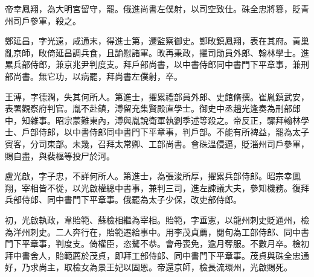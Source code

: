 \begin{pinyinscope}
 帝幸鳳翔，為大明宮留守，罷。俄進尚書左僕射，以司空致仕。硃全忠將篡，貶青州司戶參軍，殺之。



 鄭延昌，字光遠，咸通末，得進士第，遷監察御史。鄭畋鎮鳳翔，表在其府。黃巢亂京師，畋倚延昌調兵食，且諭慰諸軍。畋再秉政，擢司勛員外郎、翰林學士。進累兵部侍郎，兼京兆尹判度支。拜戶部尚書，以中書侍郎同中書門下平章事，兼刑部尚書。無它功，以病罷，拜尚書左僕射，卒。



 王溥，字德潤，失其何所人。第進士，擢累禮部員外郎、史館脩撰。崔胤鎮武安，表署觀察府判官。胤不赴鎮，溥留充集賢殿直學士。御史中丞趙光逢奏為刑部郎中，知雜事。昭宗蒙難東內，溥與胤說衛軍執劉季述等殺之。帝反正，驟拜翰林學士、戶部侍郎，以中書侍郎同中書門下平章事，判戶部。不能有所裨益，罷為太子賓客，分司東部。未幾，召拜太常卿、工部尚書。會硃溫侵逼，貶淄州司戶參軍，賜自盡，與裴樞等投尸於河。



 盧光啟，字子忠，不詳何所人。第進士，為張浚所厚，擢累兵部侍郎。昭宗幸鳳翔，宰相皆不從，以光啟權總中書事，兼判三司，進左諫議大夫，參知機務。復拜兵部侍郎、同中書門下平章事。俄罷為太子少保，改吏部侍郎。



 初，光啟執政，韋貽範、蘇檢相繼為宰相。貽範，字垂憲，以龍州刺史貶通州，檢為洋州刺史。二人奔行在，貽範遷給事中。用李茂貞薦，閱旬為工部侍郎、同中書門下平章事，判度支。倚權臣，恣驁不恭。會母喪免，逾月奪服。不數月卒。檢初拜中書舍人，貽範薦於茂貞，即拜工部侍郎、同中書門下平章事。茂貞與硃全忠通好，乃求尚主，取檢女為景王妃以固恩。帝還京師，檢長流環州，光啟賜死。



\end{pinyinscope}